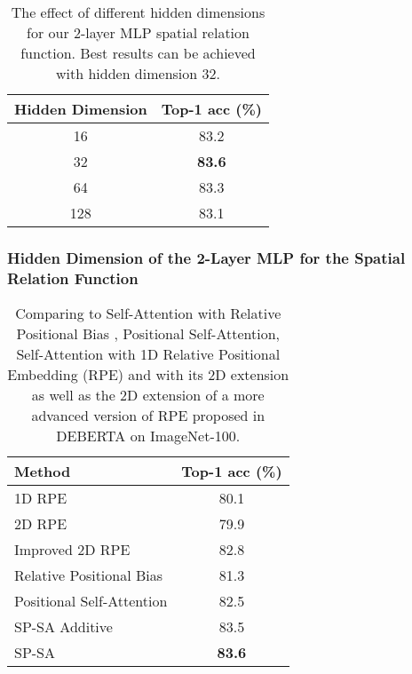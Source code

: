 \documentclass[authorversion, sigconf, acmthm=false, nonacm=true]{acmart}
\begin{document}
\begin{table}[ht]
  \caption{The effect of different hidden dimensions for our 2-layer MLP spatial relation function. Best results can be achieved with hidden dimension 32.
  }
  \centering
\begin{tabular}{c|c}
         \toprule  
Hidden Dimension &   Top-1 acc (\%) \\
     \midrule
 16 & 83.2 \\ 
 32 & \textbf{83.6} \\ 
  64 & 83.3 \\
   128 & 83.1 \\ 
\bottomrule
  \end{tabular}
\label{table.mlp}
\end{table}
\subsubsection{Hidden Dimension of the 2-Layer MLP for the Spatial Relation Function}

\begin{table}[ht]
  \caption{Comparing to Self-Attention with Relative 
  Positional Bias \cite{liu2021swin}, Positional Self-Attention\cite{d'ascoli2021convit}, Self-Attention with 1D Relative 
  Positional Embedding (RPE) \cite{shaw2018self} and with its 2D extension as well as the 2D extension of a more advanced version of RPE proposed in DEBERTA \cite{he2021deberta} on ImageNet-100.
  }
  \centering
\begin{tabular}{l|c}
         \toprule     
Method &   Top-1 acc (\%) \\
     \midrule
     

     1D RPE \cite{shaw2018self} &80.1 \\ 

     2D RPE \cite{shaw2018self}  & 79.9\\ 
     
     Improved 2D RPE \cite{he2021deberta}  & 82.8\\ 
     Relative Positional Bias \cite{liu2021swin} & 81.3 \\ 
     Positional Self-Attention \cite{d'ascoli2021convit} & 82.5 \\ 
 SP-SA Additive  & 83.5 \\ 
 SP-SA   & \textbf{83.6} \\ 
\bottomrule
  \end{tabular}
\label{table.5c}
\end{table}
\end{document}

